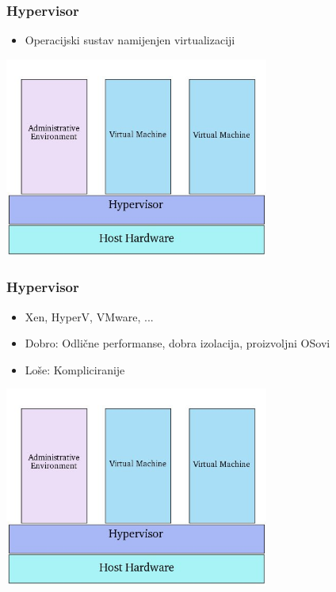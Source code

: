 \documentclass[t]{beamer}
\begin{document}
\begin{frame}
	\frametitle{Hypervisor}
	\centering
	\begin{itemize}
		\item Operacijski sustav namijenjen virtualizaciji
	\end{itemize}
	\includegraphics[width=0.65\textwidth]{hypervisor_virt.jpg}
\end{frame}

\begin{frame}
	\frametitle{Hypervisor}
	\centering
	\begin{itemize}
		\item Xen, HyperV, VMware, ...
    \item Dobro: Odlične performanse, dobra izolacija, proizvoljni OSovi
    \item Loše: Kompliciranije
	\end{itemize}
	\includegraphics[width=0.65\textwidth]{hypervisor_virt.jpg}
\end{frame}
\end{document}
